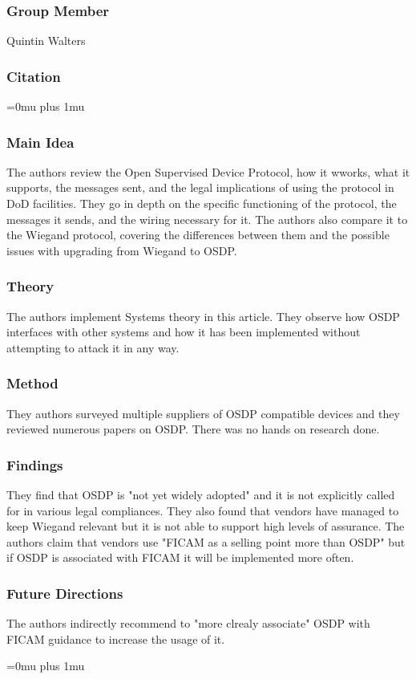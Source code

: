 \subsubsection{Group Member}

\noindent
Quintin Walters

\noindent
\subsubsection{Citation}

\Urlmuskip=0mu plus 1mu\relax

\subsubsection{Main Idea}

\noindent
The authors review the Open Supervised Device Protocol, how it wworks, what it supports, the messages sent, and the legal implications of using the protocol in DoD facilities.  They go in depth on the specific functioning of the protocol, the messages it sends, and the wiring necessary for it.  The authors also compare it to the Wiegand protocol, covering the differences between them and the possible issues with upgrading from Wiegand to OSDP.

\subsubsection{Theory}

\noindent
The authors implement Systems theory in this article.  They observe how OSDP interfaces with other systems and how it has been implemented without attempting to attack it in any way.

\subsubsection{Method}

\noindent
They authors surveyed multiple suppliers of OSDP compatible devices and they reviewed numerous papers on OSDP.  There was no hands on research done.

\subsubsection{Findings}

\noindent
They find that OSDP is "not yet widely adopted" and it is not explicitly called for in various legal compliances.  They also found that vendors have managed to keep Wiegand relevant but it is not able to support high levels of assurance.  The authors claim that vendors use "FICAM as a selling point more than OSDP" but if OSDP is associated with FICAM it will be implemented more often.

\subsubsection{Future Directions}

\noindent
The authors indirectly recommend to "more clrealy associate" OSDP with FICAM guidance to increase the usage of it.

\Urlmuskip=0mu plus 1mu\relax
\pagebreak
